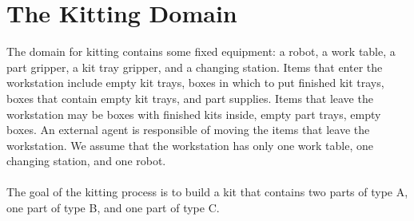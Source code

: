 \section{The Kitting Domain}\label{kitting_domain}

The domain for kitting contains some fixed equipment: a robot, a work table, a part gripper, a kit tray gripper, and a changing station. Items that enter the workstation include empty kit trays, boxes in which to put finished kit trays, boxes that contain empty kit trays, and part supplies. Items that leave the workstation may be boxes with finished kits inside, empty part trays, empty boxes. An external agent is responsible of moving the items that leave the workstation. We assume that the workstation has only one work table, one changing station, and one robot.\\ \\


The goal of the kitting process is to build a kit that contains two parts of type A, one part of type B, and one part of type C. 

